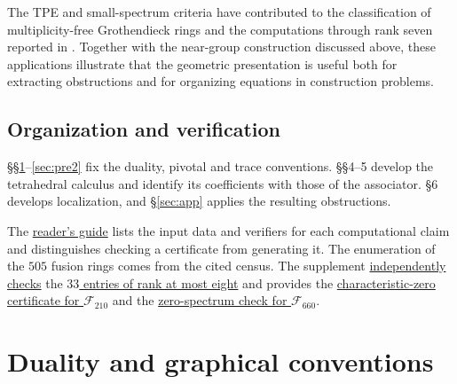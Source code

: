 \documentclass{amsart}
\begin{document}
The TPE and small-spectrum criteria have contributed to the classification of multiplicity-free Grothendieck rings \cite[\S4.1]{LPRmult1} and the computations through rank seven reported in \cite{SliVer,gvfuscat,VS26,gjwiki}. Together with the near-group construction discussed above, these applications illustrate that the geometric presentation is useful both for extracting obstructions and for organizing equations in construction problems.

\subsection*{Organization and verification}
\S\S\ref{sec:pre}--\ref{sec:pre2} fix the duality, pivotal and trace conventions. \S\S4--5 develop the tetrahedral calculus and identify its coefficients with those of the associator. \S6 develops localization, and \S\ref{sec:app} applies the resulting obstructions.

The \href{https://github.com/sebastienpalcoux/triangular-prism-categorification/blob/f816c697fde088b261e1fe1ce703980e5dbdab51/GUIDE.md#4-verify-the-papers-applications}{reader's guide} lists the input data and verifiers for each computational claim and distinguishes checking a certificate from generating it. The enumeration of the $505$ fusion rings comes from the cited census. The supplement \href{https://github.com/sebastienpalcoux/triangular-prism-categorification/blob/f816c697fde088b261e1fe1ce703980e5dbdab51/census/verify_census.py}{independently checks} the \href{https://github.com/sebastienpalcoux/triangular-prism-categorification/blob/f816c697fde088b261e1fe1ce703980e5dbdab51/census/rank_at_most_8.json}{$33$ entries of rank at most eight} and provides the \href{https://github.com/sebastienpalcoux/triangular-prism-categorification/blob/f816c697fde088b261e1fe1ce703980e5dbdab51/CERTIFICATE.md}{characteristic-zero certificate for $\mathcal F_{210}$} and the \href{https://github.com/sebastienpalcoux/triangular-prism-categorification/blob/f816c697fde088b261e1fe1ce703980e5dbdab51/verify.py#L79-L87}{zero-spectrum check for $\mathcal F_{660}$}.

\tableofcontents

\section{Duality and graphical conventions}\label{sec:pre}
\end{document}
